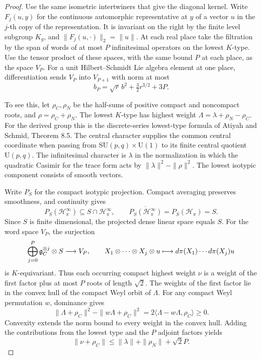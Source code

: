 \begin{proof}
Use the same isometric intertwiners that give the diagonal kernel.
Write \(F_j(u,y)\) for the continuous automorphic representative at
\(y\) of a vector \(u\) in the \(j\)-th copy of the representation.
It is invariant on the right by the finite level subgroup \(K_g\),
and \(\|F_j(u,\cdot)\|_2=\|u\|\). At each real place take the
filtration by the span of words of at most \(P\) infinitesimal
operators on the lowest \(K\)-type. Use the tensor product of these
spaces, with the same bound \(P\) at each place, as the space \(V_P\).
For a unit Hilbert--Schmidt Lie algebra element at one place,
differentiation sends \(V_P\) into \(V_{P+1}\) with norm at most
\begin{equation}\label{eq:count-step}
 b_P=\sqrt r\,b^2+\tfrac32 r^{3/2}+3P .
\end{equation}

To see this, let \(\rho_C,\rho_N\) be the half-sums of positive
compact and noncompact roots, and \(\rho=\rho_C+\rho_N\). The
lowest \(K\)-type has highest weight \(\Lambda=\lambda+\rho_N-\rho_C\).
For the derived group this is the discrete-series lowest-type formula
of Atiyah and Schmid, Theorem 8.5. The central character supplies
the common central coordinate when passing from
\(\mathrm{SU}(p,q)\times \mathrm U(1)\) to its finite central quotient
\(\mathrm U(p,q)\).
The infinitesimal character is \(\lambda\) in the normalization in
which the quadratic Casimir for the trace form acts by
\(\|\lambda\|^2-\|\rho\|^2\). \cite{atiyah-schmid}
The lowest isotypic component consists of smooth vectors.

Write \(P_S\) for the compact isotypic projection. Compact
averaging preserves smoothness, and continuity gives
\[
 P_S(\mathcal H_\pi^\infty)\subseteq S\cap\mathcal H_\pi^\infty,
 \qquad \overline{P_S(\mathcal H_\pi^\infty)}=P_S(\mathcal H_\pi)=S .
\]
Since \(S\) is finite dimensional, the projected dense linear space
equals \(S\).
For the word space \(V_P\), the surjection
\[
 \bigoplus_{j=0}^P\mathfrak g_{C}^{\otimes j}\otimes S
      \longrightarrow V_P,\qquad
 X_1\otimes\cdots\otimes X_j\otimes u
       \longmapsto d\pi(X_1)\cdots d\pi(X_j)u
\]
is \(K\)-equivariant.
Thus each occurring compact highest weight \(\nu\) is a weight of
the first factor plus at most \(P\) roots of length \(\sqrt2\).
The weights of the first factor lie in the convex hull of the compact
Weyl orbit of \(\Lambda\). For any compact Weyl permutation \(w\), dominance gives
\[
 \|\Lambda+\rho_C\|^2-\|w\Lambda+\rho_C\|^2
      =2\langle\Lambda-w\Lambda,\rho_C\rangle\ge0 .
\]
Convexity extends the norm bound to every weight in the convex hull. Adding the contributions from the lowest type and the \(P\) adjoint
factors yields
\[
         \|\nu+\rho_C\|\le\|\lambda\|+\|\rho_N\|+\sqrt2 P .
\]


\end{proof}
